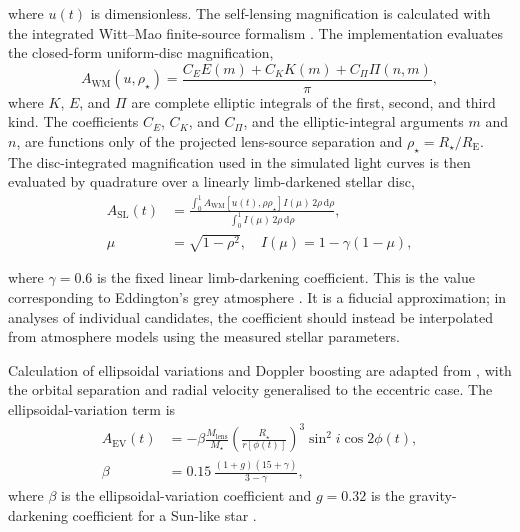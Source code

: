 \documentclass[fleqn,usenatbib]{mnras}
\begin{document}
where $u(t)$ is dimensionless. The self-lensing magnification is calculated with the integrated Witt--Mao finite-source formalism \citep{witt_can_1994}. The implementation evaluates the closed-form uniform-disc magnification,
\begin{equation}
    A_\mathrm{WM}(u, \rho_\star) =
    \frac{
        C_E E(m) + C_K K(m) + C_\Pi \Pi(n, m)
    }{\pi},
\end{equation}
where $K$, $E$, and $\Pi$ are complete elliptic integrals of the first, second, and third kind. The coefficients $C_E$, $C_K$, and $C_\Pi$, and the elliptic-integral arguments $m$ and $n$, are functions only of the projected lens-source separation and $\rho_\star = R_\star / R_\mathrm{E}$. The disc-integrated magnification used in the simulated light curves is then evaluated by quadrature over a linearly limb-darkened stellar disc,
\begin{align}
    A_\mathrm{SL}(t) & =
    \frac{
        \int_0^1
        A_\mathrm{WM}\left[u(t), \rho\rho_\star\right]
        I(\mu)\,2\rho\,\mathrm{d}\rho
    }{
        \int_0^1 I(\mu)\,2\rho\,\mathrm{d}\rho
    },
    \nonumber                             \\
    \mu              & = \sqrt{1-\rho^2},
    \quad
    I(\mu) = 1 - \gamma(1-\mu),
\end{align}


where $\gamma=0.6$ is the fixed linear limb-darkening coefficient. This is the value corresponding to Eddington's grey atmosphere \citep{eddington1926}. It is a fiducial approximation; in analyses of individual candidates, the coefficient should instead be interpolated from atmosphere models using the measured stellar parameters.

Calculation of ellipsoidal variations and Doppler boosting are adapted from \cite{sorabella_modeling_2022}, with the orbital separation and radial velocity generalised to the eccentric case. The ellipsoidal-variation term is
\begin{align}
    A_\mathrm{EV}(t) & =
    -\beta
    \frac{M_\mathrm{lens}}{M_\star}
    \left(\frac{R_\star}{r[\phi(t)]}\right)^3
    \sin^2 i \cos 2\phi(t),
    \nonumber                                                           \\
    \beta            & = 0.15\,\frac{(1 + g)(15 + \gamma)}{3 - \gamma},
\end{align}
where $\beta$ is the ellipsoidal-variation coefficient and $g=0.32$ is the gravity-darkening coefficient for a Sun-like star \citep{lucy_gravity-darkening_1967}.
\end{document}
